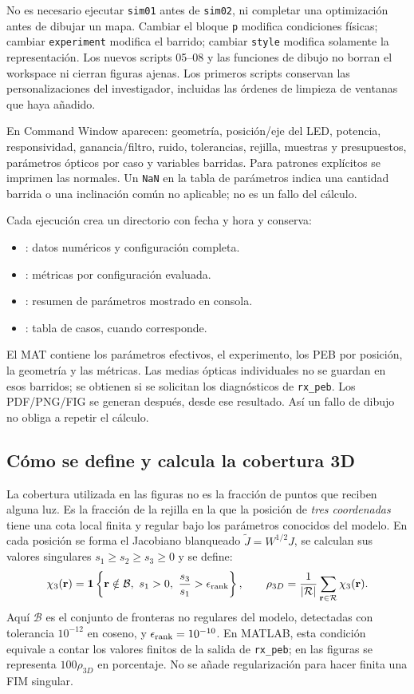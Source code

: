 \documentclass[11pt,a4paper]{article}
\begin{document}
No es necesario ejecutar \texttt{sim01} antes de \texttt{sim02}, ni completar una optimización antes de dibujar un mapa. Cambiar el bloque \texttt{p} modifica condiciones físicas; cambiar \texttt{experiment} modifica el barrido; cambiar \texttt{style} modifica solamente la representación. Los nuevos scripts 05--08 y las funciones de dibujo no borran el workspace ni cierran figuras ajenas. Los primeros scripts conservan las personalizaciones del investigador, incluidas las órdenes de limpieza de ventanas que haya añadido.

En Command Window aparecen: geometría, posición/eje del LED, potencia, responsividad, ganancia/filtro, ruido, tolerancias, rejilla, muestras y presupuestos, parámetros ópticos por caso y variables barridas. Para patrones explícitos se imprimen las normales. Un \texttt{NaN} en la tabla de parámetros indica una cantidad barrida o una inclinación común no aplicable; no es un fallo del cálculo.

Cada ejecución crea un directorio con fecha y hora y conserva:
\begin{itemize}
\item {}: datos numéricos y configuración completa.
\item {}: métricas por configuración evaluada.
\item {}: resumen de parámetros mostrado en consola.
\item {}: tabla de casos, cuando corresponde.
\end{itemize}
El MAT contiene los parámetros efectivos, el experimento, los PEB por posición, la geometría y las métricas. Las medias ópticas individuales no se guardan en esos barridos; se obtienen si se solicitan los diagnósticos de \texttt{rx\_peb}. Los PDF/PNG/FIG se generan después, desde ese resultado. Así un fallo de dibujo no obliga a repetir el cálculo.

\subsection{Cómo se define y calcula la cobertura 3D}
La cobertura utilizada en las figuras no es la fracción de puntos que reciben alguna luz. Es la fracción de la rejilla en la que la posición de \emph{tres coordenadas} tiene una cota local finita y regular bajo los parámetros conocidos del modelo. En cada posición se forma el Jacobiano blanqueado $\widetilde J=W^{1/2}J$, se calculan sus valores singulares $s_1\geq s_2\geq s_3\geq0$ y se define:
\begin{equation}
\chi_3(\mathbf r)=\mathbf1\left\{\mathbf r\notin\mathcal B,\ s_1>0,\ \frac{s_3}{s_1}>\epsilon_{\rm rank}\right\},\qquad
\rho_{3D}=\frac{1}{|\mathcal R|}\sum_{\mathbf r\in\mathcal R}\chi_3(\mathbf r).
\label{eq:coverage_3d_exact}
\end{equation}
Aquí $\mathcal B$ es el conjunto de fronteras no regulares del modelo, detectadas con tolerancia $10^{-12}$ en coseno, y $\epsilon_{\rm rank}=10^{-10}$. En MATLAB, esta condición equivale a contar los valores finitos de la salida de \texttt{rx\_peb}; en las figuras se representa $100\rho_{3D}$ en porcentaje. No se añade regularización para hacer finita una FIM singular.
\end{document}
